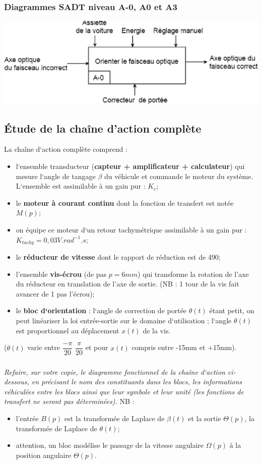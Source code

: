 \documentclass[11pt,oneside]{article}
\begin{document}
\subsubsection*{Diagrammes SADT niveau A-0, A0 et A3}
\begin{center}
 \includegraphics[width=.6\textwidth]{png/image3}
\end{center}

\subsection*{Étude de la chaîne d’action complète}
La chaîne d‘action complète comprend :
\begin{itemize}
 \item l‘ensemble transducteur (\textbf{capteur + amplificateur + calculateur})
qui mesure l‘angle de tangage $\beta$ du véhicule et commande le moteur du
système. L‘ensemble est assimilable à un gain pur : $K_c$;
\item le \textbf{moteur à courant continu} dont la fonction de transfert est
notée $M(p)$;
\item on équipe ce moteur d‘un retour tachymétrique assimilable à un gain pur : 
   $K_{tachy}=0,03 V.rad^{-1}.s$;
\item le \textbf{réducteur de vitesse} dont le rapport de réduction est de 490;
\item l’ensemble \textbf{vis-écrou} (de pas $p = 6mm$) qui transforme la
rotation de l’axe du réducteur en translation de l’axe de sortie. (NB : 1
tour de la vis fait avancer de 1 pas l’écrou);
\item le \textbf{bloc d‘orientation} : l‘angle de correction de portée
$\theta(t)$ étant petit, on peut linéariser la loi entrée-sortie sur le
domaine d‘utilisation ; l‘angle $\theta(t)$ est proportionnel au déplacement
$x(t)$ de la vis.
\end{itemize}

($\theta(t)$ varie entre $\dfrac{-\pi}{20}$ $\dfrac{\pi}{20}$ et pour
$x(t)$ compris entre -15mm et +15mm).

\subparagraph{}
\textit{Refaire, sur votre copie, le diagramme fonctionnel de la chaîne d‘action
ci-dessous, en précisant le nom des constituants dans les blocs, les
informations véhiculées entre les blocs ainsi que leur symbole et leur unité
(les fonctions de transfert ne seront pas déterminées).}
NB : 
\begin{itemize}
 \item l’entrée $B(p)$ est la transformée de Laplace de $\beta(t)$ et la sortie
$\Theta(p)$, la transformée de Laplace de $\theta(t)$;
\item attention, un bloc modélise le passage de la vitesse angulaire $\Omega(p)$
à la position angulaire $\Theta(p)$.
\end{itemize}
\end{document}
